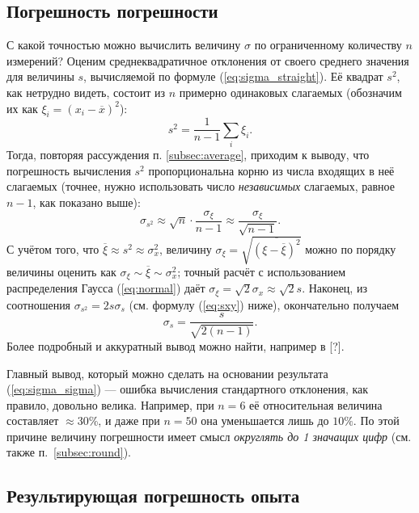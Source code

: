 \documentclass[10pt]{article}
\begin{document}
\subsection{Погрешность погрешности}

С какой точностью можно вычислить величину $\sigma$ по ограниченному
количеству $n$ измерений? Оценим среднеквадратичное отклонения от
своего среднего значения для величины $s$, вычисляемой по формуле
(\ref{eq:sigma_straight}). Её квадрат $s^{2}$, как нетрудно видеть,
состоит из $n$ примерно одинаковых слагаемых (обозначим их как $\xi_{i}=\left(x_{i}-\overline{x}\right)^{2}$):
\[
s^{2}=\frac{1}{n-1}\sum_{i}\xi_{i}.
\]
Тогда, повторяя рассуждения п. \ref{subsec:average}, приходим к выводу,
что погрешность вычисления $s^{2}$ пропорциональна корню из числа
входящих в неё слагаемых (точнее, нужно использовать число \emph{независимых}
слагаемых, равное $n-1$, как показано выше):
\[
\sigma_{s^{2}}\approx\sqrt{n}\cdot\frac{\sigma_{\xi}}{n-1}\approx
\frac{\sigma_{\xi}}{\sqrt{n-1}}.
\]
С учётом того, что $\overline{\xi}\approx s^{2}\approx\sigma_{x}^{2}$,
величину $\sigma_{\xi}=\sqrt{\overline{\left(\xi-\overline{\xi}\right)^{2}}}$
можно по порядку величины оценить как $\sigma_{\xi}\sim\overline{\xi}\sim\sigma_{x}^{2}$;
точный расчёт с использованием распределения Гаусса (\ref{eq:normal})
даёт $\sigma_{\xi}=\sqrt{2}\sigma_{x}\approx\sqrt{2}s.$ Наконец,
из соотношения $\sigma_{s^{2}}=2s\sigma_{s}$ (см. формулу (\ref{eq:sxy})
ниже), окончательно получаем
\begin{equation}
\sigma_{s}=\frac{s}{\sqrt{2\left(n-1\right)}}.\label{eq:sigma_sigma}
\end{equation}
Более подробный и аккуратный вывод можно найти, например в {[}?{]}.

Главный вывод, который можно сделать на основании результата (\ref{eq:sigma_sigma})
--- ошибка вычисления стандартного отклонения, как правило,
довольно велика. Например, при $n=6$ её относительная величина составляет
$\approx$30\%, и даже при $n=50$ она уменьшается лишь до $10\%$.
По этой причине величину погрешности имеет смысл \emph{округлять до
1 значащих цифр} (см. также п.~\ref{subsec:round}).

\subsection{Результирующая погрешность опыта}
\end{document}
